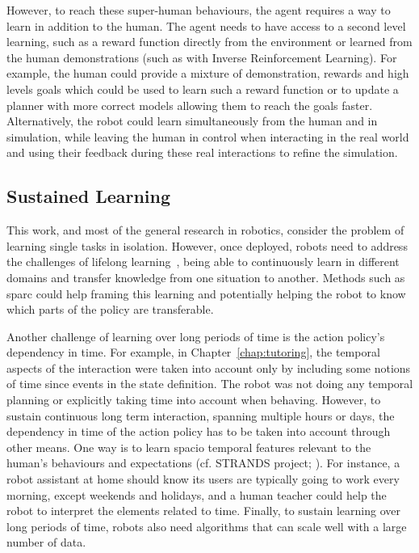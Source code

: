 However, to reach these super-human behaviours, the agent requires a way to learn in addition to the human. The agent needs to have access to a second level learning, such as a reward function directly from the environment or learned from the human demonstrations (such as with Inverse Reinforcement Learning). For example, the human could provide a mixture of demonstration, rewards and high levels goals which could be used to learn such a reward function or to update a planner with more correct models allowing them to reach the goals faster. Alternatively, the robot could learn simultaneously from the human and in simulation, while leaving the human in control when interacting in the real world and using their feedback during these real interactions to refine the simulation.

\subsection{Sustained Learning}

This work, and most of the general research in robotics, consider the problem of learning single tasks in isolation. However, once deployed, robots need to address the challenges of lifelong learning~\citep{thrun1995lifelong}, being able to continuously learn in different domains and transfer knowledge from one situation to another. Methods such as \gls{sparc} could help framing this learning and potentially helping the robot to know which parts of the policy are transferable.

Another challenge of learning over long periods of time is the action policy's dependency in time. For example, in Chapter~\ref{chap:tutoring}, the temporal aspects of the interaction were taken into account only by including some notions of time since events in the state definition. The robot was not doing any temporal planning or explicitly taking time into account when behaving. However, to sustain continuous long term interaction, spanning multiple hours or days, the dependency in time of the action policy has to be taken into account through other means. One way is to learn spacio temporal features relevant to the human's behaviours and expectations (cf. STRANDS project; \citealt{hawes2017strands}). For instance, a robot assistant at home should know its users are typically going to work every morning, except weekends and holidays, and a human teacher could help the robot to interpret the elements related to time. Finally, to sustain learning over long periods of time, robots also need algorithms that can scale well with a large number of data. 

